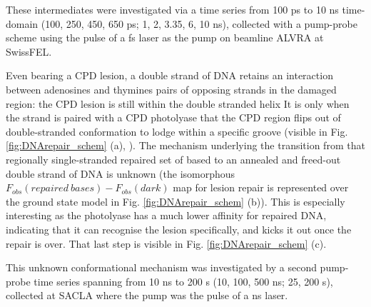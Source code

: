 These intermediates were investigated via a time series from 100 ps to 10 ns time-domain (100, 250, 450, 650 ps; 1, 2, 3.35, 6, 10 ns), collected with a pump-probe scheme using the pulse of a fs laser as the pump on beamline ALVRA at SwissFEL.

Even bearing a CPD lesion, a double strand of DNA retains an interaction between adenosines and thymines pairs of opposing strands in the damaged region: the CPD lesion is still within the double stranded helix \parencite{parkCrystalStructureDNA2002} It is only when the strand is paired with a CPD photolyase that the CPD region flips out of double-stranded conformation to lodge within a specific groove (visible in Fig. \ref{fig:DNArepair_schem} (a), \cite{maestre-reynaTwistTurnRevised2018}). The mechanism underlying the transition from that regionally single-stranded repaired set of based to an annealed and freed-out double strand of DNA is unknown (the isomorphous \(F_{obs}(repaired\ bases) - F_{obs}(dark)\) map for lesion repair is represented over the ground state model in Fig. \ref{fig:DNArepair_schem} (b)). This is especially interesting as the photolyase has a much lower affinity for repaired DNA, indicating that it can recognise the lesion specifically, and kicks it out once the repair is over. That last step is visible in Fig. \ref{fig:DNArepair_schem} (c).

This unknown conformational mechanism was investigated by a second pump-probe time series spanning from 10 ns to 200 \textmu s (10, 100, 500 ns; 25, 200 \textmu s), collected at SACLA where the pump was the pulse of a ns laser.

